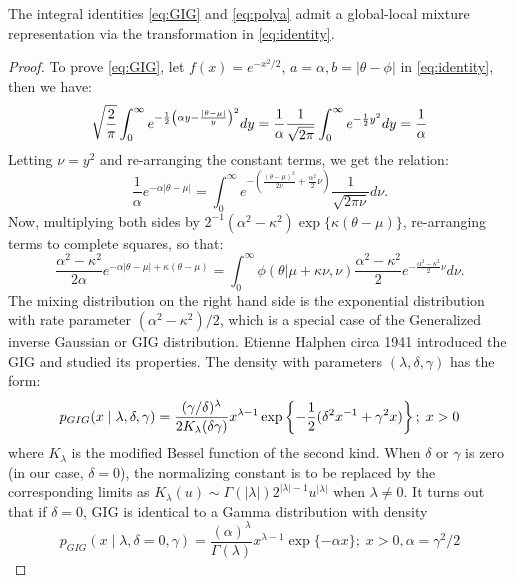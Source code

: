\documentclass[lineno]{biometrika}
\begin{document}
\begin{lemma}
The integral identities \eqref{eq:GIG} and \eqref{eq:polya} admit a global-local mixture representation via the \CS transformation in \eqref{eq:identity}. 
\end{lemma}
\begin{proof}
To prove \eqref{eq:GIG}, let $f(x) = e^{-x^2/2}$, $a = \alpha, b = |\theta-\phi|$ in \eqref{eq:identity}, then we have: 
$$
\sqrt{\frac{2}{\pi}} \int_{0}^{\infty} e^{-\frac{1}{2} \left(\alpha y - \frac{|\theta-\mu|}{y} \right)^2} dy = \frac{1}{\alpha}\frac{1}{\sqrt{2\pi}} \int_0^{\infty} e^{-\frac{1}{2} y^2} dy = \frac{1}{\alpha}
$$
Letting $\nu = y^2$ and re-arranging the constant terms, we get the relation:
$$
\frac{1}{\alpha} e^{-\alpha|\theta-\mu|} = \int_{0}^{\infty} e^{-\left( \frac{(\theta-\mu)^2}{2\nu} + \frac{\alpha^2}{2} \nu \right)} \frac{1}{\sqrt{2\pi\nu}} d\nu.
$$
Now, multiplying both sides by $2^{-1}(\alpha^2-\kappa^2) \exp\{\kappa(\theta-\mu)\}$, re-arranging terms to complete squares, so that: 
\begin{equation*}
  \frac{\alpha^2-\kappa^2}{2\alpha} e^{-\alpha|\theta-\mu| + \kappa(\theta-\mu)} = \int_0^{\infty} \phi(\theta | \mu + \kappa \nu, \nu) \frac{\alpha^2-\kappa^2}{2} e^{-\frac{\alpha^2-\kappa^2}{2} \nu} d \nu.
\end{equation*}
The mixing distribution on the right hand side is the exponential distribution with rate parameter $(\alpha^2-\kappa^2)/2$, which is a special case of the Generalized inverse Gaussian or GIG distribution. Etienne Halphen circa 1941 \citep{seshadri1997halphen} introduced the GIG and \citet{barndorff1977infinite} studied its properties. The density with parameters $(\lambda, \delta, \gamma)$ has the form: 
$$
p_{GIG}(x \mid \lambda, \delta, \gamma) = \frac{(\gamma/\delta)^{\lambda}}{2K_{\lambda}(\delta \gamma)} x^{\lambda-1} \exp \left\{ -\frac{1}{2} (\delta^2 x^{-1} + 
\gamma^2 x )  \right\}; \; x > 0
$$
where $K_{\lambda}$ is the modified Bessel function of the second kind. When $\delta$ or $\gamma$ is zero (in our case, $\delta = 0$), the normalizing constant is to be replaced by the corresponding limits as $K_{\lambda}(u) \sim \Gamma(|\lambda|)2^{|\lambda|-1} u^{|\lambda|}$ when $\lambda \neq 0$. It turns out that if $\delta=0$, GIG is identical to a Gamma distribution with density 
$$
p_{GIG}(x \mid \lambda, \delta = 0 , \gamma) = \frac{(\alpha)^{\lambda}}{\Gamma(\lambda)} x^{\lambda-1} \exp\{ -\alpha x \}; \; x > 0, \alpha = \gamma^2 / 2 
$$

\end{proof}
\end{document}
